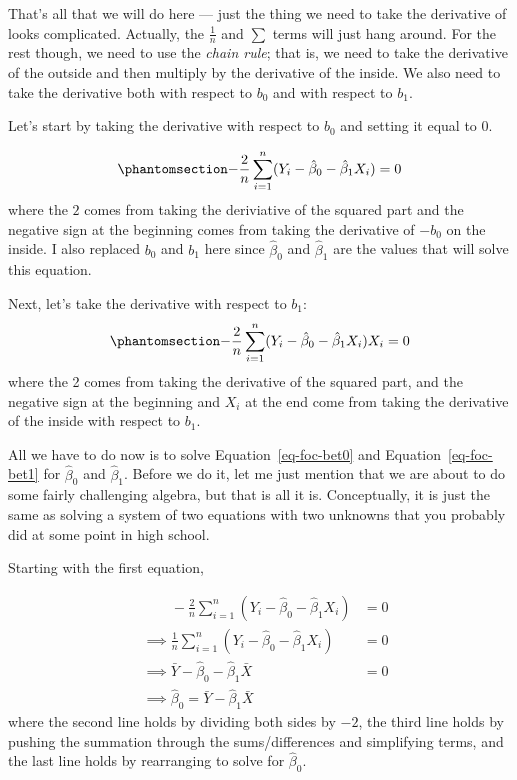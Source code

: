 \documentclass[
  letterpaper,
  DIV=11,
  numbers=noendperiod]{scrreprt}
\begin{document}
That's all that we will do here --- just the thing we need to take the
derivative of looks complicated. Actually, the \(\frac{1}{n}\) and
\(\sum\) terms will just hang around. For the rest though, we need to
use the \emph{chain rule}; that is, we need to take the derivative of
the outside and then multiply by the derivative of the inside. We also
need to take the derivative both with respect to \(b_0\) and with
respect to \(b_1\).

Let's start by taking the derivative with respect to \(b_0\) and setting
it equal to 0.

\begin{equation}\phantomsection\label{eq-foc-bet0}{
  -\frac{2}{n}\sum_{i=1}^n (Y_i - \hat{\beta}_0 - \hat{\beta}_1 X_i) = 0 
}\end{equation} where the \(2\) comes from taking the deriviative of the
squared part and the negative sign at the beginning comes from taking
the derivative of \(-b_0\) on the inside. I also replaced \(b_0\) and
\(b_1\) here since \(\hat{\beta}_0\) and \(\hat{\beta}_1\) are the
values that will solve this equation.

Next, let's take the derivative with respect to \(b_1\):
\begin{equation}\phantomsection\label{eq-foc-bet1}{
  -\frac{2}{n} \sum_{i=1}^n (Y_i - \hat{\beta}_0 - \hat{\beta}_1 X_i) X_i = 0 
}\end{equation} where the 2 comes from taking the derivative of the
squared part, and the negative sign at the beginning and \(X_i\) at the
end come from taking the derivative of the inside with respect to
\(b_1\).

All we have to do now is to solve Equation~\ref{eq-foc-bet0} and
Equation~\ref{eq-foc-bet1} for \(\hat{\beta}_0\) and \(\hat{\beta}_1\).
Before we do it, let me just mention that we are about to do some fairly
challenging algebra, but that is all it is. Conceptually, it is just the
same as solving a system of two equations with two unknowns that you
probably did at some point in high school.

Starting with the first equation,

\[
  \begin{aligned}
  & \phantom{\implies} -\frac{2}{n} \sum_{i=1}^n (Y_i - \hat{\beta}_0 - \hat{\beta}_1 X_i) &= 0 \\
  & \implies \frac{1}{n} \sum_{i=1}^n (Y_i - \hat{\beta}_0 - \hat{\beta}_1 X_i) &= 0 \\
  & \implies \bar{Y} - \hat{\beta}_0 - \hat{\beta}_1 \bar{X} &= 0 \\
  & \implies \boxed{\hat{\beta}_0 = \bar{Y} - \hat{\beta}_1 \bar{X}} 
  \end{aligned} 
\] where the second line holds by dividing both sides by \(-2\), the
third line holds by pushing the summation through the sums/differences
and simplifying terms, and the last line holds by rearranging to solve
for \(\hat{\beta}_0\).
\end{document}
